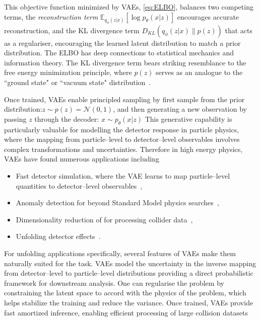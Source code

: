         This objective function minimized by VAEs, \cref{eq:ELBO}, balances two competing terms, the \emph{reconstruction term} \(\mathbb{E}_{q_{\phi}(z|x)}[\log p_{\theta}(x|z)]\) encourages accurate reconstruction, and the KL divergence term \(D_{KL}(q_{\phi}(z|x) \| p(z))\) that acts as a regulariser, encouraging the learned latent distribution to match a prior distribution.
        The ELBO has deep connections to statistical mechanics and information theory.
        The KL divergence term bears striking resemblance to the free energy minimization principle, where \(p(z)\) serves as an analogue to the ``ground state" or ``vacuum state" distribution~\cite{bilionis_free_2012}.

        Once trained, VAEs enable principled sampling by first sample from the prior distribution:\(z \sim p(z) = \mathcal{N}(0, 1)\), and then generating a new observation by passing \(z\) through the decoder: \(x \sim p_{\theta}(x|z)\)
        This generative capability is particularly valuable for modelling the detector response in particle physics, where the mapping from particle--level to detector--level observables involves complex transformations and uncertainties.
        Therefore in high energy physics, VAEs have found numerous applications including
        \begin{itemize}
            \item Fast detector simulation, where the VAE learns to map particle--level quantities to detector--level observables~\cite{Darulis2022MachineSimulations, hashemi_deep_2024},
            \item Anomaly detection for beyond Standard Model physics searches~\cite{liu_fast_2023},
            \item Dimensionality reduction of for processing collider data~\cite{yue_autoencoders_2024},
            \item Unfolding detector effects~\cite{erdmann_autoencoder-extended_2023}.
        \end{itemize}
        For unfolding applications specifically, several features of VAEs make them naturally suited for the task.
        VAEs model the uncertainty in the inverse mapping from detector--level to particle--level distributions providing a direct probabilistic framework for downstream analysis.
        One can regularise the problem by constraining the latent space to accord with the physics of the problem, which helps stabilize the training and reduce the variance.
        Once trained, VAEs provide fast amortized inference, enabling efficient processing of large collision datasets


